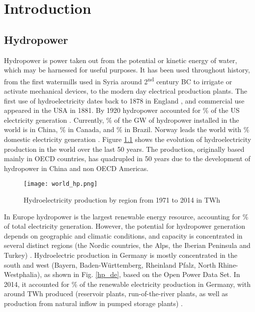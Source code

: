 \chapter{Introduction}
\label{chap:introduction}


\section{Hydropower}

Hydropower is power taken out from the potential or kinetic energy of water, which may be harnessed for useful purposes. It has been used throughout history, from the first watermills used in Syria around 2\textsuperscript{nd} century BC \cite{reynolds} to irrigate or activate mechanical devices, to the modern day electrical production plants. The first use of hydroelectricity dates back to 1878 in England \cite{indus_arch}, and commercial use appeared in the USA in 1881. By 1920 hydropower accounted for \unit[25]{\%} of the US electricity generation \cite{hist_hyd}. \newline
Currently,  \unit[27]{\%}  of the \unit[1171]{GW} of hydropower installed in the world is  in China, \unit[10]{\%} in Canada, and \unit[9]{\%} in Brazil. Norway leads the world with \unit[96]{\%} domestic electricity generation \cite{iea_stat}. Figure \ref{world_hp} shows the evolution of hydroelectricity production in the world over the last 50 years. The production, originally based mainly in OECD countries, has quadrupled in 50 years due to the development of hydropower in China and non OECD Americas.

\begin{figure}[H]
\centering
\texttt{[image: world\_hp.png]}
\caption[Hydroelectricity production by region from 1971 to 2014 in TWh]{Hydroelectricity production by region from 1971 to 2014 in TWh \cite{iea_stat}}
\label{world_hp}
\end{figure}

In Europe hydropower is the largest renewable energy resource, accounting for \unit[18]{\%} of total electricity generation. However, the potential for hydropower generation depends on geographic and climatic conditions, and capacity is concentrated in several distinct regions (the Nordic countries, the Alps, the Iberian Peninsula and Turkey) \cite{hp_europe}. \newline
Hydroelectric production in Germany is mostly concentrated in the south and west (Bayern, Baden-Württemberg, Rheinland Pfalz, North Rhine-Westphalia), as shown in Fig. \ref{hp_de}, based on the Open Power Data Set. In 2014, it accounted for \unit[12]{\%} of the renewable electricity production in Germany, with around \unit[20]{TWh} produced (reservoir plants, run-of-the-river plants, as well as production from natural inflow in pumped storage plants) \cite{bdew}.

